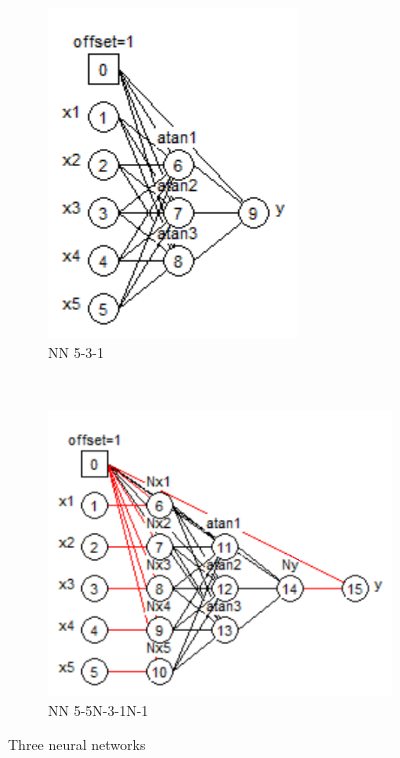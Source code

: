 \begin{figure}
\begin{subfigure}[b]{0.250\textwidth}
        \includegraphics[width=\textwidth]{RN3b2.png}
        \caption{NN 5-3-1}
        \label{fig:N531}
    \end{subfigure}
    ~ 
    \begin{subfigure}[b]{0.396\textwidth}
        \includegraphics[width=\textwidth]{RN3c2.png}
        \caption{NN 5-5N-3-1N-1}
        \label{fig:N55311}
    \end{subfigure}
    \caption{Three neural networks}
\end{figure}

